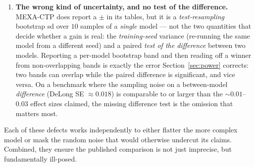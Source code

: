 \documentclass[a4paper,fleqn]{cas-sc}
\begin{document}
\begin{enumerate}[leftmargin=1.4em,itemsep=1pt,topsep=2pt]
\item \textbf{The wrong kind of uncertainty, and no test of the difference.} MEXA-CTP does report a $\pm$ in its tables, but it is a \emph{test-resampling} bootstrap sd over $10$ samples of a \emph{single} model --- not the two quantities that decide whether a gain is real: the \emph{training-seed} variance (re-running the same model from a different seed) and a paired \emph{test of the difference} between two models. Reporting a per-model bootstrap band and then reading off a winner from non-overlapping bands is exactly the error Section~\ref{sec:power} corrects: two bands can overlap while the paired difference is significant, and vice versa. On a benchmark where the sampling noise on a between-model \emph{difference} (DeLong SE $\approx0.018$) is comparable to or larger than the $\sim0.01$--$0.03$ effect sizes claimed, the missing difference test is the omission that matters most.
\end{enumerate}
Each of these defects works independently to either flatter the more complex model or mask the random noise that would otherwise undercut its claims. Combined, they ensure the published comparison is not just imprecise, but fundamentally ill-posed.
\end{document}

